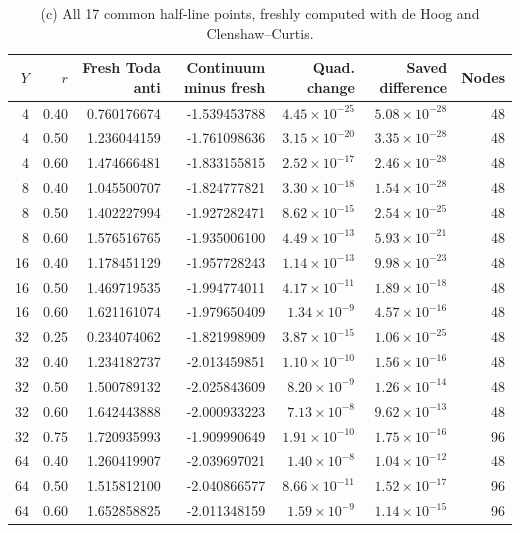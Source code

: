 \documentclass[11pt,a4paper]{article}
\begin{document}
\begingroup\small\setlength{\tabcolsep}{4pt}
\begin{longtable}{@{}rrrrrrr@{}}
\caption{(c) All 17 common half-line points, freshly computed with de Hoog and Clenshaw--Curtis.}\\
\toprule $Y$ & $r$ & Fresh Toda anti & Continuum minus fresh & Quad. change & Saved difference & Nodes\\\midrule\endhead
4 & 0.40 & 0.760176674 & -1.539453788 & $4.45\times10^{-25}$ & $5.08\times10^{-28}$ & 48\\
4 & 0.50 & 1.236044159 & -1.761098636 & $3.15\times10^{-20}$ & $3.35\times10^{-28}$ & 48\\
4 & 0.60 & 1.474666481 & -1.833155815 & $2.52\times10^{-17}$ & $2.46\times10^{-28}$ & 48\\
8 & 0.40 & 1.045500707 & -1.824777821 & $3.30\times10^{-18}$ & $1.54\times10^{-28}$ & 48\\
8 & 0.50 & 1.402227994 & -1.927282471 & $8.62\times10^{-15}$ & $2.54\times10^{-25}$ & 48\\
8 & 0.60 & 1.576516765 & -1.935006100 & $4.49\times10^{-13}$ & $5.93\times10^{-21}$ & 48\\
16 & 0.40 & 1.178451129 & -1.957728243 & $1.14\times10^{-13}$ & $9.98\times10^{-23}$ & 48\\
16 & 0.50 & 1.469719535 & -1.994774011 & $4.17\times10^{-11}$ & $1.89\times10^{-18}$ & 48\\
16 & 0.60 & 1.621161074 & -1.979650409 & $1.34\times10^{-9}$ & $4.57\times10^{-16}$ & 48\\
32 & 0.25 & 0.234074062 & -1.821998909 & $3.87\times10^{-15}$ & $1.06\times10^{-25}$ & 48\\
32 & 0.40 & 1.234182737 & -2.013459851 & $1.10\times10^{-10}$ & $1.56\times10^{-16}$ & 48\\
32 & 0.50 & 1.500789132 & -2.025843609 & $8.20\times10^{-9}$ & $1.26\times10^{-14}$ & 48\\
32 & 0.60 & 1.642443888 & -2.000933223 & $7.13\times10^{-8}$ & $9.62\times10^{-13}$ & 48\\
32 & 0.75 & 1.720935993 & -1.909990649 & $1.91\times10^{-10}$ & $1.75\times10^{-16}$ & 96\\
64 & 0.40 & 1.260419907 & -2.039697021 & $1.40\times10^{-8}$ & $1.04\times10^{-12}$ & 48\\
64 & 0.50 & 1.515812100 & -2.040866577 & $8.66\times10^{-11}$ & $1.52\times10^{-17}$ & 96\\
64 & 0.60 & 1.652858825 & -2.011348159 & $1.59\times10^{-9}$ & $1.14\times10^{-15}$ & 96\\
\bottomrule\end{longtable}\endgroup
\end{document}
